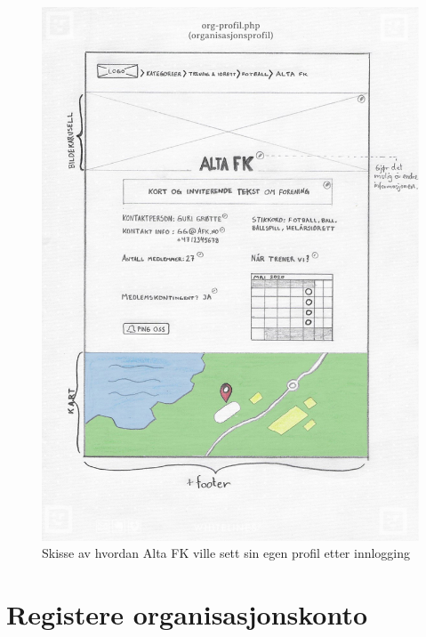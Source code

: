 \begin{figure}[H]
\centering
\includegraphics[width=.9\textwidth]{Illustrasjoner/Skisser-pdf/1.0/1-14-innlogget-organisasjonsprofil.pdf}
\caption{Skisse av hvordan Alta FK ville sett sin egen profil etter innlogging}
\label{vedlegg:1-14-innlogget-organisasjonsprofil}
\end{figure}

\section{Registere organisasjonskonto}

